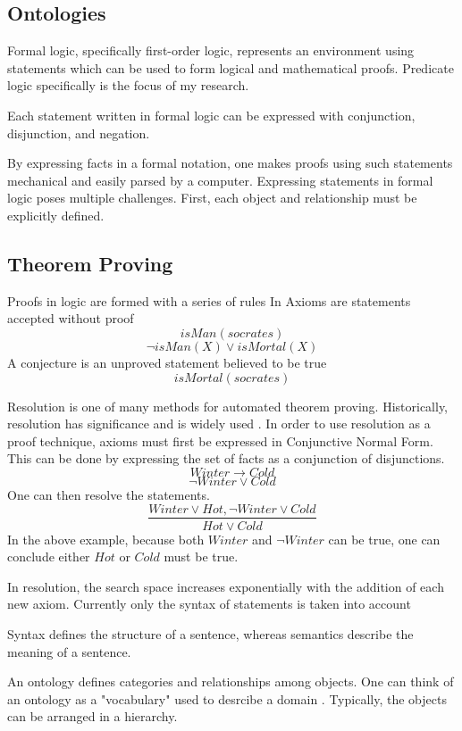 \documentclass{article}
\begin{document}
		\subsection{Ontologies}
Formal logic, specifically first-order logic, represents an environment using statements which can be used to form logical and mathematical proofs. Predicate logic specifically is the focus of my research. 

Each statement written in formal logic can be expressed with conjunction, disjunction, and negation. 

By expressing facts in a formal notation, one makes proofs using such statements mechanical and easily parsed by a computer. Expressing statements in formal logic poses multiple challenges. First, each object and relationship must be explicitly defined. 
	
		\subsection{Theorem Proving}
Proofs in logic are formed with a series of rules 
In Axioms are statements accepted without proof
        \[isMan(socrates)\]
        \[\lnot isMan(X)\lor isMortal(X)\]
	    A conjecture is an unproved statement believed to be true 
	    \[isMortal(socrates)\]
	


Resolution is one of many methods for automated theorem proving. Historically, resolution has significance and is widely used \cite[51]{ertel2018introduction}.
In order to use resolution as a proof technique, axioms must first be expressed in Conjunctive Normal Form. This can be done by expressing the set of facts as a conjunction of disjunctions. 
		\[Winter \rightarrow Cold\]
		\[\lnot Winter \lor Cold\]
		One can then resolve the statements. 
		\[\frac{Winter \lor Hot, \lnot Winter \lor Cold}{Hot \lor Cold}\]
		In the above example, because both $Winter$ and $\lnot Winter $ can be true, one can conclude either $Hot$ or $Cold$ must be true. 
		

In resolution, the search space increases exponentially with the addition of each new axiom. 
Currently only the syntax of statements is taken into account

	

        Syntax defines the structure of a sentence, whereas semantics describe the meaning of a sentence. 
	

		An ontology defines categories and relationships among objects.
		One can think of an ontology as a "vocabulary" used to desrcibe a domain \cite[308]{russell2016artificial}. Typically, the objects can be arranged in a hierarchy. 
		
\end{document}
